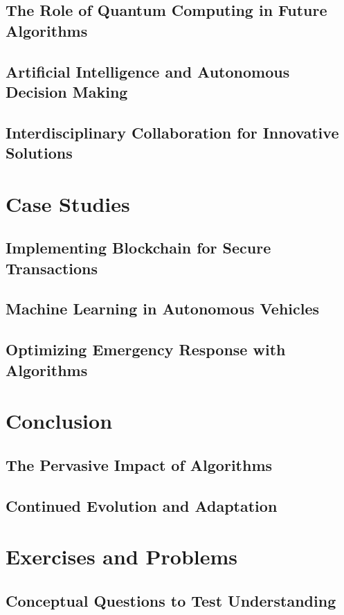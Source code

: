 \documentclass[12pt]{book} %
\begin{document}
\subsection{The Role of Quantum Computing in Future Algorithms}
\subsection{Artificial Intelligence and Autonomous Decision Making}
\subsection{Interdisciplinary Collaboration for Innovative Solutions}

\section{Case Studies}
\subsection{Implementing Blockchain for Secure Transactions}
\subsection{Machine Learning in Autonomous Vehicles}
\subsection{Optimizing Emergency Response with Algorithms}

\section{Conclusion}
\subsection{The Pervasive Impact of Algorithms}
\subsection{Continued Evolution and Adaptation}

\section{Exercises and Problems}
\subsection{Conceptual Questions to Test Understanding}
\end{document}
